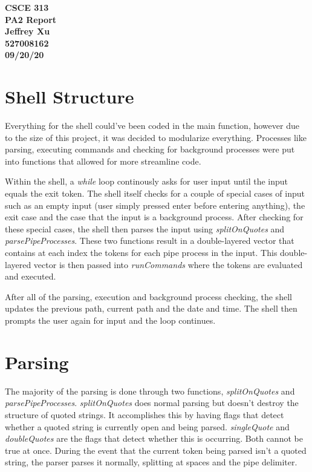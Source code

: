 \documentclass[12pt]{article}
\newcommand\tab[1][0.7cm]{\hspace*{#1}}
\begin{document}
\begin{center}

{\bf
CSCE 313\\
PA2 Report\\
Jeffrey Xu\\
527008162\\
09/20/20\\
}

\end{center}

\section{Shell Structure}

\tab Everything for the shell could've been coded in the main function, however due to the size of this project, it was decided to modularize everything. Processes like parsing, executing commands and checking for background processes were put into functions that allowed for more streamline code. 

Within the shell, a \emph{while} loop continously asks for user input until the input equals the exit token. The shell itself checks for a couple of special cases of input such as an empty input (user simply pressed enter before entering anything), the exit case and the case that the input is a background process. After checking for these special cases, the shell then parses the input using \emph{splitOnQuotes} and \emph{parsePipeProcesses}. These two functions result in a double-layered vector that contains at each index the tokens for each pipe process in the input. This double-layered vector is then passed into \emph{runCommands} where the tokens are evaluated and executed. 

After all of the parsing, execution and background process checking, the shell updates the previous path, current path and the date and time. The shell then prompts the user again for input and the loop continues. 

\section{Parsing}

\tab The majority of the parsing is done through two functions, \emph{splitOnQuotes} and \emph{parsePipeProcesses}. \emph{splitOnQuotes} does normal parsing but doesn't destroy the structure of quoted strings. It accomplishes this by having flags that detect whether a quoted string is currently open and being parsed. \emph{singleQuote} and \emph{doubleQuotes} are the flags that detect whether this is occurring. Both cannot be true at once. During the event that the current token being parsed isn't a quoted string, the parser parses it normally, splitting at spaces and the pipe delimiter. 
\end{document}
